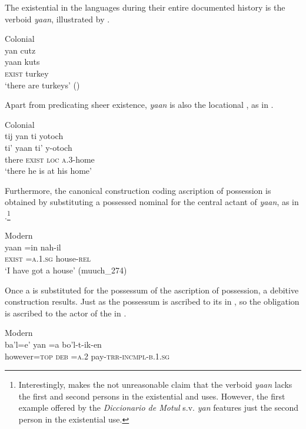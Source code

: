 \documentclass[output=paper]{langsci/langscibook}
\begin{document}
The existential  in the  languages during their entire documented history is the  verboid \textit{yaan}, illustrated by .

\ea\label{ex:lehmann:57}
Colonial  \\
      yan    cutz\\
\gll  yaan  kuts\\
\textsc{exist}  turkey\\
\glt `there are turkeys' (\citealt[§199]{Beltrán1746})
\z


Apart from predicating sheer existence, \textit{yaan} is also the locational , as in .


\ea\label{ex:lehmann:58}
Colonial   \\
      tij     yan    ti     yotoch\\
\gll   ti'      yaan    ti'    y-otoch\\
there    \textsc{exist} \textsc{loc  } \textsc{a.3}{}-home\\
\glt `there he is at his home' \citep[35v]{SanBuenaventura1684}
\z

Furthermore, the canonical construction coding ascription of possession is obtained by substituting a possessed nominal for the central actant of \textit{yaan}, as in .\footnote{Interestingly, \citet[§199]{Beltrán1746}  makes the not unreasonable claim that the verboid \textit{yaan} lacks the first and second persons in the existential and  uses. However, the first example offered by the \textit{Diccionario de Motul} s.v. \textit{yan} features just the second person in the existential use.}\newpage

\ea\label{ex:lehmann:59}
Modern   \\
\gll       yaan  =in      nah-il\\
  \textsc{exist}   \textsc{=a.1.sg}    house-\textsc{rel}\\
\glt  `I have got a house' (muuch\_274)
\z

Once a  is substituted for the possessum of the ascription of possession, a debitive construction results. Just as the possessum is ascribed to its  in , so the obligation is ascribed to the actor of the  in .

\ea\label{ex:lehmann:60}
Modern  \\
\gll      ba'l=e'        yan  =a    bo'l-t-ik-en\\
  however=\textsc{top}   \textsc{deb  } \textsc{=a.2}    pay-\textsc{trr-incmpl-b.1.sg}\\
\end{document}

